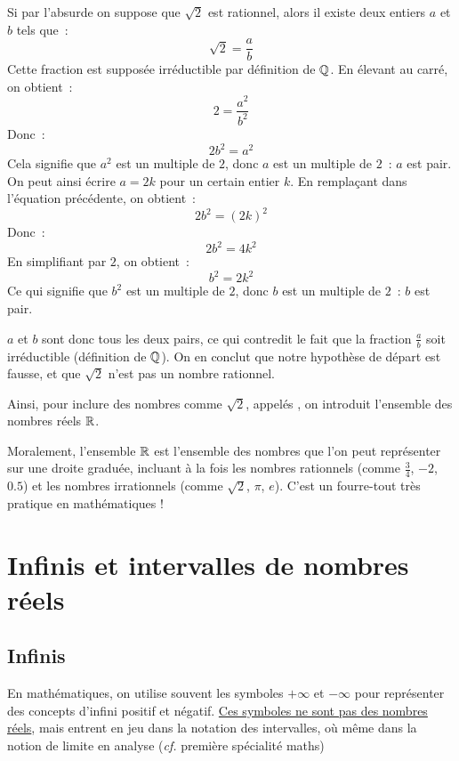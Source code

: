 \begin{demonstration}
    Si par l'absurde on suppose que $\sqrt{2}$ est rationnel, alors il existe deux entiers $a$ et $b$ tels que~:
    $$ \sqrt{2} = \frac{a}{b} $$
    Cette fraction est supposée irréductible par définition de $\mathbb{Q}$. En élevant au carré, on obtient~:
    $$ 2 = \frac{a^2}{b^2} $$
    Donc~:
    $$ 2b^2 = a^2 $$
    Cela signifie que $a^2$ est un multiple de $2$, donc $a$ est un multiple de $2$~: $a$ est pair. On peut ainsi écrire $a = 2k$ pour un certain entier $k$. En remplaçant dans l'équation précédente, on obtient~:
    $$ 2b^2 = (2k)^2 $$
    Donc~:
    $$ 2b^2 = 4k^2 $$
    En simplifiant par $2$, on obtient~:
    $$ b^2 = 2k^2 $$
    Ce qui signifie que $b^2$ est un multiple de $2$, donc $b$ est un multiple de $2$~: $b$ est pair.

    $a$ et $b$ sont donc tous les deux pairs, ce qui contredit le fait que la fraction $\frac{a}{b}$ soit irréductible (définition de $\mathbb{Q}$). On en conclut que notre hypothèse de départ est fausse, et que $\sqrt{2}$ n'est pas un nombre rationnel.
\end{demonstration}

Ainsi, pour inclure des nombres comme $\sqrt{2}$, appelés , on introduit l'ensemble des nombres réels $\mathbb{R}$.

\begin{remarque}{}{}
    Moralement, l'ensemble $\mathbb{R}$ est l'ensemble des nombres que l'on peut représenter sur une droite graduée, incluant à la fois les nombres rationnels (comme $\frac{3}{4}$, $-2$, $0.5$) et les nombres irrationnels (comme $\sqrt{2}$, $\pi$, $e$).
    C'est un fourre-tout très pratique en mathématiques !
\end{remarque}

\section{Infinis et intervalles de nombres réels}

\subsection{Infinis}
En mathématiques, on utilise souvent les symboles $+\infty$ et $-\infty$ pour représenter des concepts d'infini positif et négatif. \underline{Ces symboles ne sont pas des nombres réels}, mais entrent en jeu dans la notation des intervalles, où même dans la notion de limite en analyse (\textit{cf.} première spécialité maths)

